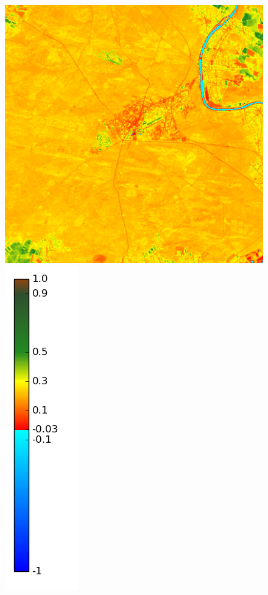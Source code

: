 \documentclass{book}
\begin{document}
\begin{figure}[H]
{\includegraphics[scale=0.2]{images/Fontainebleau/04_ndvi.png}
\includegraphics[scale=0.2]{images/colormap.png}
}
\end{figure}
\end{document}
